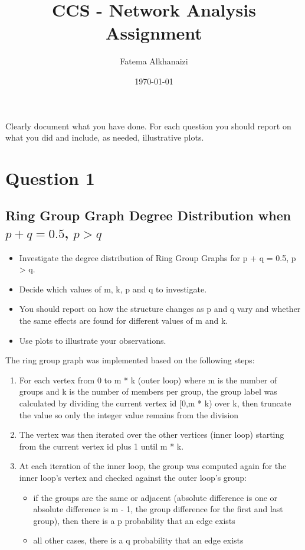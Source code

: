 \documentclass[11pt,a4paper,notitlepage]{article}
\title{CCS - Network Analysis Assignment}
\author{Fatema Alkhanaizi}
\date{\today}
\begin{document}
\graphicspath{ {../distributions/q2/} {../distributions/q1/} {../distributions/q3/} }

\maketitle

\noindent
Clearly document what you have done. For each question you should report on what you did and include, as needed, illustrative plots.

\section*{Question 1}
\subsection*{Ring Group Graph Degree Distribution when $p + q = 0.5$, $p > q$}
\begin{itemize}
    \item Investigate the degree distribution of Ring Group Graphs for p + q = 0.5, p > q. 
    \item Decide which values of m, k, p and q to investigate. 
    \item You should report on how the structure changes as p and q vary and whether the same effects are found for different values of m and k.
    \item Use plots to illustrate your observations.
\end{itemize}
The ring group graph was implemented based on the following steps:
\begin{enumerate}
    \item For each vertex from 0 to m * k (outer loop) where m is the number of groups and k is the number of members per group, the group label was calculated by dividing the current vertex id [0,m * k) over k, then truncate the value so only the integer value remains from the division
    \item The vertex was then iterated over the other vertices (inner loop) starting from the current vertex id plus 1 until m * k. 
    \item At each iteration of the inner loop, the group was computed again for the inner loop's vertex and checked against the outer loop's group:
    \begin{itemize}
        \item if the groups are the same or adjacent (absolute difference is one or absolute difference is m - 1, the group difference for the first and last group), then there is a p probability that an edge exists
        \item all other cases, there is a q probability that an edge exists
    \end{itemize}
\end{enumerate}
\end{document}
